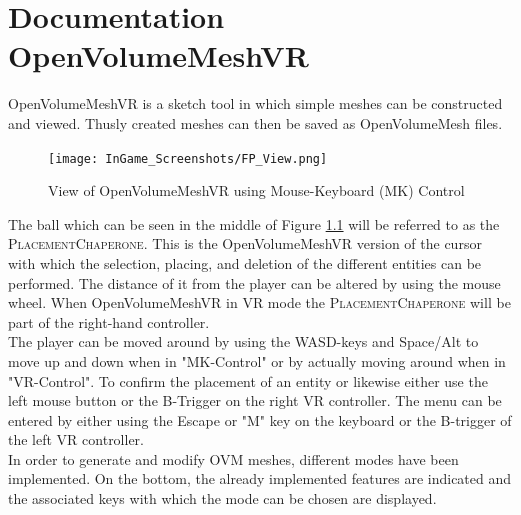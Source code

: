 \documentclass{report}
\begin{document}
\chapter{Documentation OpenVolumeMeshVR}
	OpenVolumeMeshVR is a sketch tool in which simple meshes can be constructed and viewed. Thusly created meshes can then be saved as OpenVolumeMesh files.
	\begin{figure}[H]
		\begin{center}
			\texttt{[image: InGame\_Screenshots/FP\_View.png]}
			\caption{View of OpenVolumeMeshVR using Mouse-Keyboard (MK) Control}
			\label{FPView}
		\end{center}
	\end{figure}
	\noindent The ball which can be seen in the middle of Figure \ref{FPView} will be referred to as the \textsc{PlacementChaperone}. This is the OpenVolumeMeshVR version of the cursor with which the selection, placing, and deletion of the different entities can be performed. The distance of it from the player can be altered by using the mouse wheel. When OpenVolumeMeshVR in VR mode the \textsc{PlacementChaperone} will be part of the right-hand controller. \\
	The player can be moved around by using the WASD-keys and Space/Alt to move up and down when in "MK-Control" or by actually moving around when in "VR-Control". To confirm the placement of an entity or likewise either use the left mouse button or the B-Trigger on the right VR controller. The menu can be entered by either using the Escape or "M" key on the keyboard or the B-trigger of the left VR controller. \\
	In order to generate and modify OVM meshes, different modes have been implemented. On the bottom, the already implemented features are indicated and the associated keys with which the mode can be chosen are displayed.
\end{document}
